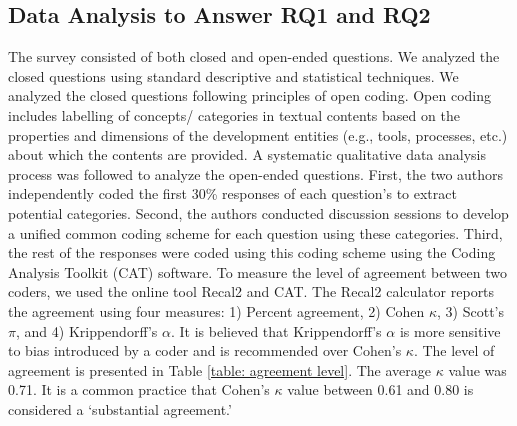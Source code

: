 % 

\subsection{Data Analysis to Answer RQ1 and RQ2}
\label{survey_data_collection}
The survey consisted of both closed and open-ended questions. 
We analyzed the closed questions using standard descriptive and statistical techniques. We analyzed the 
closed questions following principles of open coding. Open coding includes labelling of concepts/
categories in textual contents based on the properties and
dimensions of the development entities (e.g., tools, processes, etc.) about which the contents
are provided. A systematic qualitative data analysis process was followed to analyze the
open-ended questions. First, the two authors independently coded the first 30\%
responses of each question's to extract potential categories. Second, the
authors conducted discussion sessions to develop a unified common coding scheme
for each question using these categories. Third, the rest of the responses were
coded using this coding scheme using the Coding Analysis Toolkit
(CAT)\citep{Lu2008} software. To measure the level of agreement between two
coders, we used the online tool Recal2\citep{Recal2020} and CAT\citep{Lu2008}. The
Recal2 calculator reports the agreement using four measures: 1) Percent
agreement, 2) Cohen $\kappa$\citep{Cohen1960}, 3) Scott’s $\pi$\citep{scott1955},
and 4) Krippendorff’s $\alpha$\citep{krippendorff2004}. It is believed that
Krippendorff’s $\alpha$ is more sensitive to bias introduced by a coder and is
recommended\citep{Joyce2013} over Cohen's $\kappa$\citep{Cohen1960}. The level of
agreement is presented in Table \ref{table: agreement level}. The average
$\kappa$ value was 0.71. It is a common practice that Cohen's $\kappa$ value
between 0.61 and 0.80\citep{Landis1977} is considered a `substantial agreement.’
